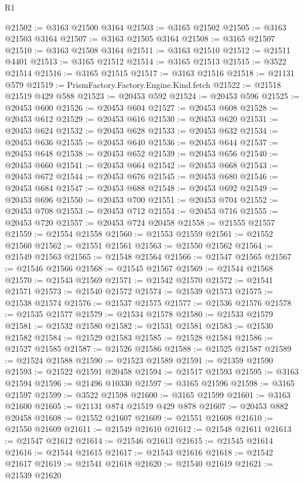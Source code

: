 \begin{lexlean}{R1}
\begin{coremodule}
@21502 := @3163 @21500 @3164
@21503 := @3165 @21502
@21505 := @3163 @21503 @3164
@21507 := @3163 @21505 @3164
@21508 := @3165 @21507
@21510 := @3163 @21508 @3164
@21511 := @3163 @21510
@21512 := @21511 @4401
@21513 := @3165 @21512
@21514 := @3165 @21513
@21515 := @3522 @21514
@21516 := @3165 @21515
@21517 := @3163 @21516
@21518 := @21131 @579
@21519 := PrismFactory.Factory.Engine.Kind.fetch
@21522 := @21518 @21519 @429 @588
@21523 := @20453 @592
@21524 := @20453 @596
@21525 := @20453 @600
@21526 := @20453 @604
@21527 := @20453 @608
@21528 := @20453 @612
@21529 := @20453 @616
@21530 := @20453 @620
@21531 := @20453 @624
@21532 := @20453 @628
@21533 := @20453 @632
@21534 := @20453 @636
@21535 := @20453 @640
@21536 := @20453 @644
@21537 := @20453 @648
@21538 := @20453 @652
@21539 := @20453 @656
@21540 := @20453 @660
@21541 := @20453 @664
@21542 := @20453 @668
@21543 := @20453 @672
@21544 := @20453 @676
@21545 := @20453 @680
@21546 := @20453 @684
@21547 := @20453 @688
@21548 := @20453 @692
@21549 := @20453 @696
@21550 := @20453 @700
@21551 := @20453 @704
@21552 := @20453 @708
@21553 := @20453 @712
@21554 := @20453 @716
@21555 := @20453 @720
@21557 := @20453 @724 @20458
@21558 := @21555 @21557
@21559 := @21554 @21558
@21560 := @21553 @21559
@21561 := @21552 @21560
@21562 := @21551 @21561
@21563 := @21550 @21562
@21564 := @21549 @21563
@21565 := @21548 @21564
@21566 := @21547 @21565
@21567 := @21546 @21566
@21568 := @21545 @21567
@21569 := @21544 @21568
@21570 := @21543 @21569
@21571 := @21542 @21570
@21572 := @21541 @21571
@21573 := @21540 @21572
@21574 := @21539 @21573
@21575 := @21538 @21574
@21576 := @21537 @21575
@21577 := @21536 @21576
@21578 := @21535 @21577
@21579 := @21534 @21578
@21580 := @21533 @21579
@21581 := @21532 @21580
@21582 := @21531 @21581
@21583 := @21530 @21582
@21584 := @21529 @21583
@21585 := @21528 @21584
@21586 := @21527 @21585
@21587 := @21526 @21586
@21588 := @21525 @21587
@21589 := @21524 @21588
@21590 := @21523 @21589
@21591 := @21359 @21590
@21593 := @21522 @21591 @20458
@21594 := @21517 @21593
@21595 := @3163 @21594
@21596 := @21496 @10330
@21597 := @3165 @21596
@21598 := @3165 @21597
@21599 := @3522 @21598
@21600 := @3165 @21599
@21601 := @3163 @21600
@21605 := @21131 @874 @21519 @429 @878
@21607 := @20453 @882 @20458
@21608 := @21552 @21607
@21609 := @21551 @21608
@21610 := @21550 @21609
@21611 := @21549 @21610
@21612 := @21548 @21611
@21613 := @21547 @21612
@21614 := @21546 @21613
@21615 := @21545 @21614
@21616 := @21544 @21615
@21617 := @21543 @21616
@21618 := @21542 @21617
@21619 := @21541 @21618
@21620 := @21540 @21619
@21621 := @21539 @21620

\end{coremodule}
\end{lexlean}
